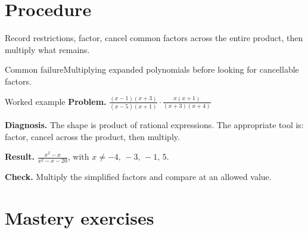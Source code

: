 \documentclass[11pt,oneside]{book}
\begin{document}
\section{Procedure}
Record restrictions, factor, cancel common factors across the entire product, then multiply what remains.

\begin{warningbox}{Common failure}Multiplying expanded polynomials before looking for cancellable factors.\end{warningbox}
\begin{examplebox}{Worked example}
\textbf{Problem.} $\displaystyle \frac{\left(x - 1\right) \left(x + 3\right)}{\left(x - 5\right) \left(x + 1\right)}\cdot\frac{x \left(x + 1\right)}{\left(x + 3\right) \left(x + 4\right)}$

\textbf{Diagnosis.} The shape is product of rational expressions. The appropriate tool is: factor, cancel across the product, then multiply.

\textbf{Result.} $\displaystyle \frac{x^{2} - x}{x^{2} - x - 20}$, with $x\ne -4,\,-3,\,-1,\,5$.

\textbf{Check.} Multiply the simplified factors and compare at an allowed value.
\end{examplebox}
\section{Mastery exercises}
\end{document}
